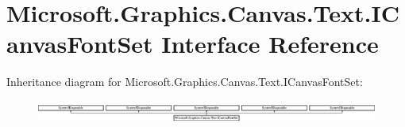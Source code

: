 \hypertarget{interface_microsoft_1_1_graphics_1_1_canvas_1_1_text_1_1_i_canvas_font_set}{}\section{Microsoft.\+Graphics.\+Canvas.\+Text.\+I\+Canvas\+Font\+Set Interface Reference}
\label{interface_microsoft_1_1_graphics_1_1_canvas_1_1_text_1_1_i_canvas_font_set}
Inheritance diagram for Microsoft.\+Graphics.\+Canvas.\+Text.\+I\+Canvas\+Font\+Set\+:\begin{figure}[H]
\begin{center}
\leavevmode
\includegraphics[height=0.759322cm]{interface_microsoft_1_1_graphics_1_1_canvas_1_1_text_1_1_i_canvas_font_set}
\end{center}
\end{figure}
